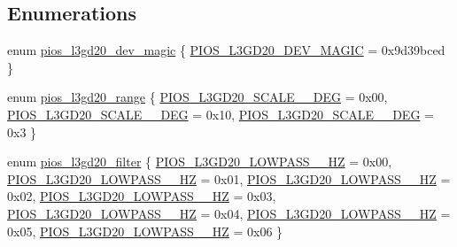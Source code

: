 \subsection*{\-Enumerations}
\begin{DoxyCompactItemize}
\item 
enum \hyperlink{group___p_i_o_s___l3_g_d20_ga34e70adc9970e3e83c4d39e720087df3}{pios\-\_\-l3gd20\-\_\-dev\-\_\-magic} \{ \hyperlink{group___p_i_o_s___l3_g_d20_gga34e70adc9970e3e83c4d39e720087df3a8ff24655b5a2966b5bdf02704790f7c1}{\-P\-I\-O\-S\-\_\-\-L3\-G\-D20\-\_\-\-D\-E\-V\-\_\-\-M\-A\-G\-I\-C} =  0x9d39bced
 \}
\item 
enum \hyperlink{group___p_i_o_s___l3_g_d20_ga704696d385abb591516d2e31301dad66}{pios\-\_\-l3gd20\-\_\-range} \{ \hyperlink{group___p_i_o_s___l3_g_d20_gga704696d385abb591516d2e31301dad66aedd6eafcd26b7ea732535c95e6df130b}{\-P\-I\-O\-S\-\_\-\-L3\-G\-D20\-\_\-\-S\-C\-A\-L\-E\-\_\-\_\-\-D\-E\-G} =  0x00, 
\hyperlink{group___p_i_o_s___l3_g_d20_gga704696d385abb591516d2e31301dad66a7e5b9b2cf555ad09aa1dd0ba78acb274}{\-P\-I\-O\-S\-\_\-\-L3\-G\-D20\-\_\-\-S\-C\-A\-L\-E\-\_\-\_\-\-D\-E\-G} =  0x10, 
\hyperlink{group___p_i_o_s___l3_g_d20_gga704696d385abb591516d2e31301dad66a3c6ef417567852dc017c6d0158a15eba}{\-P\-I\-O\-S\-\_\-\-L3\-G\-D20\-\_\-\-S\-C\-A\-L\-E\-\_\-\_\-\-D\-E\-G} =  0x3
 \}
\item 
enum \hyperlink{group___p_i_o_s___l3_g_d20_ga61c11c9fa344e4d6a9087dd81414d54c}{pios\-\_\-l3gd20\-\_\-filter} \{ \*
\hyperlink{group___p_i_o_s___l3_g_d20_gga61c11c9fa344e4d6a9087dd81414d54ca7bcc15cafe9ca8cc2ffe55a8920d9b0d}{\-P\-I\-O\-S\-\_\-\-L3\-G\-D20\-\_\-\-L\-O\-W\-P\-A\-S\-S\-\_\-\_\-\-H\-Z} =  0x00, 
\hyperlink{group___p_i_o_s___l3_g_d20_gga61c11c9fa344e4d6a9087dd81414d54cac31670f3cab1a3a10fead7d61959cee9}{\-P\-I\-O\-S\-\_\-\-L3\-G\-D20\-\_\-\-L\-O\-W\-P\-A\-S\-S\-\_\-\_\-\-H\-Z} =  0x01, 
\hyperlink{group___p_i_o_s___l3_g_d20_gga61c11c9fa344e4d6a9087dd81414d54ca6d73399d5d2252dc4e577812335b48f4}{\-P\-I\-O\-S\-\_\-\-L3\-G\-D20\-\_\-\-L\-O\-W\-P\-A\-S\-S\-\_\-\_\-\-H\-Z} =  0x02, 
\hyperlink{group___p_i_o_s___l3_g_d20_gga61c11c9fa344e4d6a9087dd81414d54cad7a50f4cfb1e0155140f7f0e5113e50e}{\-P\-I\-O\-S\-\_\-\-L3\-G\-D20\-\_\-\-L\-O\-W\-P\-A\-S\-S\-\_\-\_\-\-H\-Z} =  0x03, 
\*
\hyperlink{group___p_i_o_s___l3_g_d20_gga61c11c9fa344e4d6a9087dd81414d54ca73a26a6c815fe14b8658e2e20364cbbe}{\-P\-I\-O\-S\-\_\-\-L3\-G\-D20\-\_\-\-L\-O\-W\-P\-A\-S\-S\-\_\-\_\-\-H\-Z} =  0x04, 
\hyperlink{group___p_i_o_s___l3_g_d20_gga61c11c9fa344e4d6a9087dd81414d54ca96ce608de595fe92992a8a80117aae23}{\-P\-I\-O\-S\-\_\-\-L3\-G\-D20\-\_\-\-L\-O\-W\-P\-A\-S\-S\-\_\-\_\-\-H\-Z} =  0x05, 
\hyperlink{group___p_i_o_s___l3_g_d20_gga61c11c9fa344e4d6a9087dd81414d54ca4aafab965ecb9a13cbd74263c0609526}{\-P\-I\-O\-S\-\_\-\-L3\-G\-D20\-\_\-\-L\-O\-W\-P\-A\-S\-S\-\_\-\_\-\-H\-Z} =  0x06
 \}
\end{DoxyCompactItemize}

